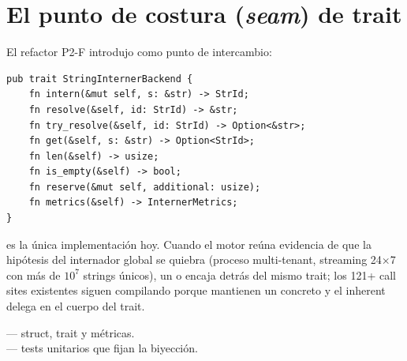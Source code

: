 \section{El punto de costura (\emph{seam}) de trait}

El refactor P2-F introdujo  como
punto de intercambio:

\begin{lstlisting}[style=rust]
pub trait StringInternerBackend {
    fn intern(&mut self, s: &str) -> StrId;
    fn resolve(&self, id: StrId) -> &str;
    fn try_resolve(&self, id: StrId) -> Option<&str>;
    fn get(&self, s: &str) -> Option<StrId>;
    fn len(&self) -> usize;
    fn is_empty(&self) -> bool;
    fn reserve(&mut self, additional: usize);
    fn metrics(&self) -> InternerMetrics;
}
\end{lstlisting}

 es la única implementación hoy. Cuando el
motor reúna evidencia de que la hipótesis del internador global
se quiebra (proceso multi-tenant, streaming 24$\times$7 con más
de $10^7$ strings únicos), un  o
 encaja detrás del mismo trait; los 121+
call sites existentes siguen compilando porque mantienen un
 concreto y el  inherent
delega en el cuerpo del trait.

\begin{inthecode}
 --- struct,
trait y métricas.\\
 --- tests
unitarios que fijan la biyección.
\end{inthecode}
